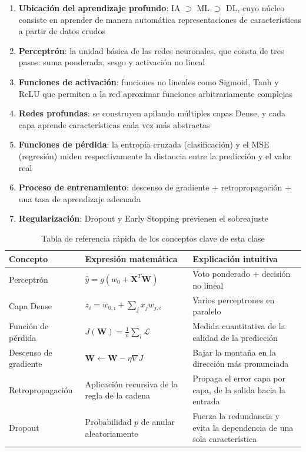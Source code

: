 \documentclass[a4paper]{article}
\begin{document}
\begin{enumerate}
\item \textbf{Ubicación del aprendizaje profundo}: IA $\supset$ ML $\supset$ DL, cuyo núcleo consiste en aprender de manera automática representaciones de características a partir de datos crudos
\item \textbf{Perceptrón}: la unidad básica de las redes neuronales, que consta de tres pasos: suma ponderada, sesgo y activación no lineal
\item \textbf{Funciones de activación}: funciones no lineales como Sigmoid, Tanh y ReLU que permiten a la red aproximar funciones arbitrariamente complejas
\item \textbf{Redes profundas}: se construyen apilando múltiples capas Dense, y cada capa aprende características cada vez más abstractas
\item \textbf{Funciones de pérdida}: la entropía cruzada (clasificación) y el MSE (regresión) miden respectivamente la distancia entre la predicción y el valor real
\item \textbf{Proceso de entrenamiento}: descenso de gradiente + retropropagación + una tasa de aprendizaje adecuada
\item \textbf{Regularización}: Dropout y Early Stopping previenen el sobreajuste
\end{enumerate}

\begin{table}[H]
\centering
\begin{tabular}{lp{5cm}p{5cm}}
\toprule
\textbf{Concepto} & \textbf{Expresión matemática} & \textbf{Explicación intuitiva} \\
\midrule
Perceptrón & $\hat{y} = g(w_0 + \mathbf{X}^T\mathbf{W})$ & Voto ponderado + decisión no lineal \\
Capa Dense & $z_i = w_{0,i} + \sum_j x_j w_{j,i}$ & Varios perceptrones en paralelo \\
Función de pérdida & $J(\mathbf{W}) = \frac{1}{n}\sum_i \mathcal{L}$ & Medida cuantitativa de la calidad de la predicción \\
Descenso de gradiente & $\mathbf{W} \leftarrow \mathbf{W} - \eta \nabla J$ & Bajar la montaña en la dirección más pronunciada \\
Retropropagación & Aplicación recursiva de la regla de la cadena & Propaga el error capa por capa, de la salida hacia la entrada \\
Dropout & Probabilidad $p$ de anular aleatoriamente & Fuerza la redundancia y evita la dependencia de una sola característica \\
\bottomrule
\end{tabular}
\caption{Tabla de referencia rápida de los conceptos clave de esta clase}
\end{table}
\end{document}
